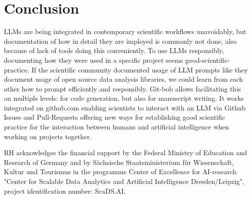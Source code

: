\documentclass{ecai}
\begin{document}
\section{Conclusion}

LLMs are being integrated in contemporary scientific workflows unavoidably, but documentation of how in detail they are imployed is commonly not done, also because of lack of tools doing this conveniently. To use LLMs responsibly, documenting how they were used in a specific project seems good-scientific-practice. If the scientific community documented usage of LLM prompts like they document usage of open source data analysis libraries, we could learn from each other how to prompt efficiently and responsibly. Git-bob allows facilitating this on multiple levels: for code generation, but also for manuscript writing. It works integrated on github.com enabling scientists to interact with an LLM via Github Issues and Pull-Requests offering new ways for establishing good scientific practice for the interaction between humans and artificial intelligence when working on projects together.



\begin{ack}
RH acknowledges the financial support by the Federal Ministry of Education and Research of Germany and by Sächsische Staatsministerium für Wissenschaft, Kultur und Tourismus in the programme Center of Excellence for AI-research "Center for Scalable Data Analytics and Artificial Intelligence Dresden/Leipzig", project identification number: ScaDS.AI.

\end{ack}




\end{document}
